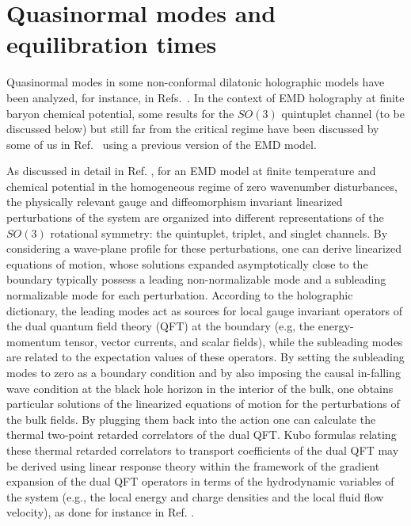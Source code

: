 \documentclass[aps,prd,showkeys,superscriptaddress,singlecolumn,nofootinbib,floatfix]{revtex4-1}
\begin{document}
\section{Quasinormal modes and equilibration times}
\label{sec:QNMs}

Quasinormal modes \cite{Horowitz:1999jd,Kokkotas:1999bd,Kovtun:2005ev,Berti:2009kk,Konoplya:2011qq,Buchel:2015saa} in some non-conformal dilatonic holographic models have been analyzed, for instance, in Refs.\ \cite{Janik:2015waa,Janik:2015iry,Janik:2016btb,Attems:2016ugt,Gursoy:2016ggq,Demircik:2016nhr,Betzios:2017dol}. In the context of EMD holography at finite baryon chemical potential, some results for the $SO(3)$ quintuplet channel (to be discussed below) but still far from the critical regime have been discussed by some of us in Ref.\ \cite{Rougemont:2015wca} using a previous version of the EMD model.

As discussed in detail in Ref. \cite{DeWolfe:2011ts}, for an EMD model at finite temperature and chemical potential in the homogeneous regime of zero wavenumber disturbances, the physically relevant gauge and diffeomorphism invariant linearized perturbations of the system are organized into different representations of the $SO(3)$ rotational symmetry: the quintuplet, triplet, and singlet channels. By considering a wave-plane profile for these perturbations, one can derive linearized equations of motion, whose solutions expanded asymptotically close to the boundary typically possess a leading non-normalizable mode and a subleading normalizable mode for each perturbation. According to the holographic dictionary, the leading modes act as sources for local gauge invariant operators of the dual quantum field theory (QFT) at the boundary (e.g, the energy-momentum tensor, vector currents, and scalar fields), while the subleading modes are related to the expectation values of these operators. By setting the subleading modes to zero as a boundary condition and by also imposing the causal in-falling wave condition at the black hole horizon in the interior of the bulk, one obtains particular solutions of the linearized equations of motion for the perturbations of the bulk fields. By plugging them back into the action one can calculate the thermal two-point retarded correlators of the dual QFT. Kubo formulas relating these thermal retarded correlators to transport coefficients of the dual QFT may be derived using linear response theory within the framework of the gradient expansion of the dual QFT operators in terms of the hydrodynamic variables of the system (e.g., the local energy and charge densities and the local fluid flow velocity), as done for instance in Ref. \cite{Baier:2007ix}.
\end{document}
